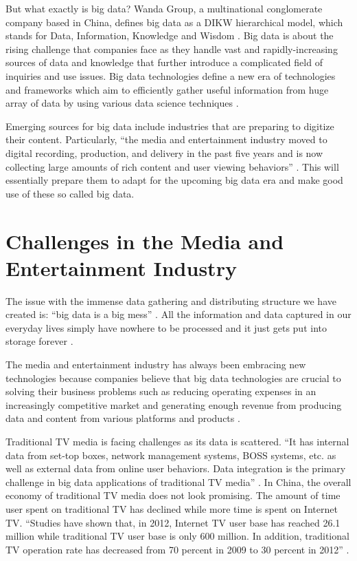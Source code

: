 But what exactly is big data? Wanda Group, a multinational conglomerate company based in China, defines big data as a DIKW hierarchical model, which stands for Data, Information, Knowledge and Wisdom \cite{Zhang2017era}. Big data is about the rising challenge that companies face as they handle vast and rapidly-increasing sources of data and knowledge that further introduce a complicated field of inquiries and use issues. Big data technologies define a new era of technologies and frameworks which aim to efficiently gather useful information from huge array of data by using various data science techniques \cite{Villars2011care}.

Emerging sources for big data include industries that are preparing to digitize their content. Particularly, ``the media and entertainment industry moved to digital recording, production, and delivery in the past five years and is now collecting large amounts of rich content and user viewing behaviors'' \cite{Villars2011care}. This will essentially prepare them to adapt for the upcoming big data era and make good use of these so called big data. 

\section{Challenges in the Media and Entertainment Industry}

The issue with the immense data gathering and distributing structure we have created is: ``big data is a big mess'' \cite{Schlieski2012data}. All the information and data captured in our everyday lives simply have nowhere to be processed and it just gets put into storage forever \cite{Schlieski2012data}.

The media and entertainment industry has always been embracing new technologies because companies believe that big data technologies are crucial to solving their business problems such as reducing operating expenses in an increasingly competitive market and generating enough revenue from producing data and content from various platforms and products \cite{Lippell2016sectors}.

Traditional TV media is facing challenges as its data is scattered. ``It has internal data from set-top boxes, network management systems, BOSS systems, etc. as well as external data from online user behaviors. Data integration is the primary challenge in big data applications of traditional TV media'' \cite{Zhang2017era}. In China, the overall economy of traditional TV media does not look promising. The amount of time user spent on traditional TV has declined while more time is spent on Internet TV. ``Studies have shown that, in 2012, Internet TV user base has reached 26.1 million while traditional TV user base is only 600 million. In addition, traditional TV operation rate has decreased from 70 percent in 2009 to 30 percent in 2012'' \cite{Zhang2017era}.

